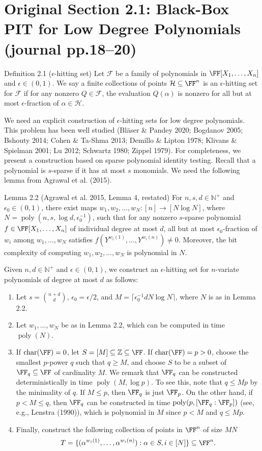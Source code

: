 \section*{Original Section 2.1: Black-Box PIT for Low Degree Polynomials (journal pp.18--20)}
\begin{result}{Definition 2.1 ($\epsilon$-hitting set)}
Let $\mathcal F$ be a family of polynomials in $\FF[X_1,\ldots,X_n]$ and $\epsilon\in(0,1)$. We say a finite collections of points $\mathcal H\subseteq\FF^n$ is an $\epsilon$-hitting set for $\mathcal F$ if for any nonzero $Q\in\mathcal F$, the evaluation $Q(\alpha)$ is nonzero for all but at most $\epsilon$-fraction of $\alpha\in\mathcal H$.
\end{result}
We need an explicit construction of $\epsilon$-hitting sets for low degree polynomials. This problem has been well studied (Bl\"aser \& Pandey 2020; Bogdanov 2005; Bshouty 2014; Cohen \& Ta-Shma 2013; Demillo \& Lipton 1978; Klivans \& Spielman 2001; Lu 2012; Schwartz 1980; Zippel 1979). For completeness, we present a construction based on sparse polynomial identity testing.
Recall that a polynomial is $s$-sparse if it has at most $s$ monomials. We need the following lemma from Agrawal et al. (2015).
\begin{result}{Lemma 2.2 (Agrawal et al. 2015, Lemma 4, restated)}
For $n,s,d\in\mathbb N^+$ and $\epsilon_0\in(0,1)$, there exist maps $w_1,w_2,\ldots,w_N:[n]\to[N\log N]$, where $N=\operatorname{poly}(n,s,\log d,\epsilon_0^{-1})$, such that for any nonzero $s$-sparse polynomial $f\in\FF[X_1,\ldots,X_n]$ of individual degree at most $d$, all but at most $\epsilon_0$-fraction of $w_i$ among $w_1,\ldots,w_N$ satisfies $f(Y^{w_i(1)},\ldots,Y^{w_i(n)})\ne0$. Moreover, the bit complexity of computing $w_1,w_2,\ldots,w_N$ is polynomial in $N$.
\end{result}
Given $n,d\in\mathbb N^+$ and $\epsilon\in(0,1)$, we construct an $\epsilon$-hitting set for $n$-variate polynomials of degree at most $d$ as follows:
\begin{enumerate}
\item Let $s=\binom{n+d}{d}$, $\epsilon_0=\epsilon/2$, and $M=\lceil\epsilon_0^{-1}dN\log N\rceil$, where $N$ is as in Lemma 2.2.
\item Let $w_1,\ldots,w_N$ be as in Lemma 2.2, which can be computed in time $\operatorname{poly}(N)$.
\item If $\operatorname{char}(\FF)=0$, let $S=[M]\subseteq\mathbb Z\subseteq\FF$. If $\operatorname{char}(\FF)=p>0$, choose the smallest $p$-power $q$ such that $q\ge M$, and choose $S$ to be a subset of $\FF_q\subseteq\FF$ of cardinality $M$. We remark that $\FF_q$ can be constructed deterministically in time $\operatorname{poly}(M,\log p)$. To see this, note that $q\le Mp$ by the minimality of $q$. If $M\le p$, then $\FF_q$ is just $\FF_p$. On the other hand, if $p<M\le q$, then $\FF_q$ can be constructed in time $\operatorname{poly}(p,[\FF_q:\FF_p])$ (see, e.g., Lenstra (1990)), which is polynomial in $M$ since $p<M$ and $q\le Mp$.
\item Finally, construct the following collection of points in $\FF^n$ of size $MN$
\[T=\{(\alpha^{w_i(1)},\ldots,\alpha^{w_i(n)}):\alpha\in S,i\in[N]\}\subseteq\FF^n.\]
\end{enumerate}
